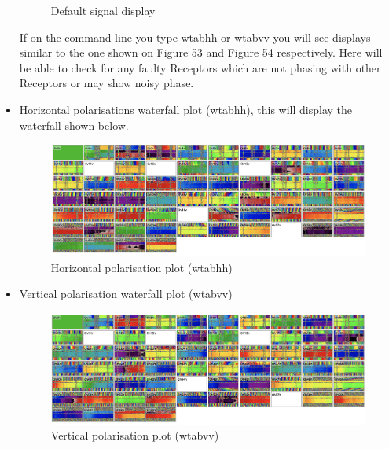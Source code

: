 \begin{itemize}
\begin{figure}[H]
	\caption{Default signal display}
	\label{fig:image50}
\end{figure}

If on the command line you type wtabhh  or wtabvv you will see displays similar to the one shown on Figure 53 and Figure 54 respectively. Here will be able to check for any faulty Receptors which are not phasing with other Receptors or may show noisy phase. 

\item{} Horizontal polarisations waterfall plot (wtabhh), this will display the waterfall shown below. 
\clearpage

\begin{figure}[!thb]
	\centering
	\includegraphics[scale=0.23]{Chapters/images/image102.png}
	
	\caption{Horizontal polarisation plot (wtabhh)}
	\label{fig:image102}
\end{figure}

\item{} Vertical polarisation waterfall plot (wtabvv)



\begin{figure}[!thb]
	\centering
	\includegraphics[scale=0.23]{Chapters/images/image36.png}
	
	\caption{Vertical polarisation plot (wtabvv)}
	\label{fig:image36}
\end{figure}


\end{itemize}
